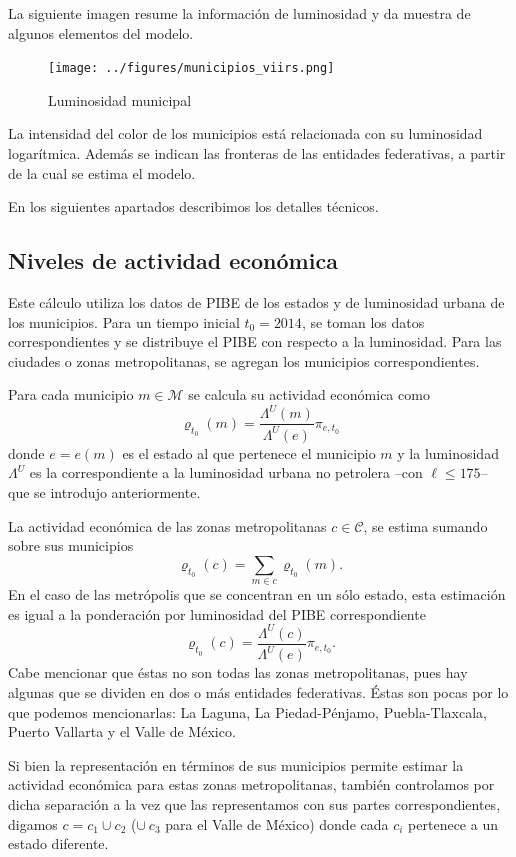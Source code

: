 \documentclass[]{article}
\begin{document}
La siguiente imagen resume la información de luminosidad y da muestra de
algunos elementos del modelo.

\begin{figure}[htbp]
\centering
\texttt{[image: ../figures/municipios\_viirs.png]}
\caption{Luminosidad municipal}
\end{figure}

La intensidad del color de los municipios está relacionada con su
luminosidad logarítmica. Además se indican las fronteras de las
entidades federativas, a partir de la cual se estima el modelo.

En los siguientes apartados describimos los detalles técnicos.

\subsection{Niveles de actividad
económica}\label{niveles-de-actividad-economica}

Este cálculo utiliza los datos de PIBE de los estados y de luminosidad
urbana de los municipios. Para un tiempo inicial \(t_0 = 2014\), se
toman los datos correspondientes y se distribuye el PIBE con respecto a
la luminosidad. Para las ciudades o zonas metropolitanas, se agregan los
municipios correspondientes.

Para cada municipio \(m \in \mathcal M\) se calcula su actividad
económica como
\[ \mathrm{\varrho}_{t_0}(m) = \frac{\Lambda^{U}(m)}{\Lambda^{U}(e)} \pi_{e,t_0}\]
donde \(e = e(m)\) es el estado al que pertenece el municipio \(m\) y la
luminosidad \(\Lambda^U\) es la correspondiente a la luminosidad urbana
no petrolera --con \(\ell \leq 175\)-- que se introdujo anteriormente.

La actividad económica de las zonas metropolitanas \(c \in \mathcal C\),
se estima sumando sobre sus municipios
\[ \varrho_{t_0}(c)=\sum_{m \in c}\varrho_{t_0}(m).\] En el caso de las
metrópolis que se concentran en un sólo estado, esta estimación es igual
a la ponderación por luminosidad del PIBE correspondiente
\[ \varrho_{t_0}(c)=\frac{\Lambda^U(c)}{\Lambda^U(e)}\pi_{e,t_0}.\] Cabe
mencionar que éstas no son todas las zonas metropolitanas, pues hay
algunas que se dividen en dos o más entidades federativas. Éstas son
pocas por lo que podemos mencionarlas: La Laguna, La Piedad-Pénjamo,
Puebla-Tlaxcala, Puerto Vallarta y el Valle de México.

Si bien la representación en términos de sus municipios permite estimar
la actividad económica para estas zonas metropolitanas, también
controlamos por dicha separación a la vez que las representamos con sus
partes correspondientes, digamos \(c=c_1\cup c_2\) (\(\cup\ c_3\) para
el Valle de México) donde cada \(c_i\) pertenece a un estado diferente.
\end{document}
